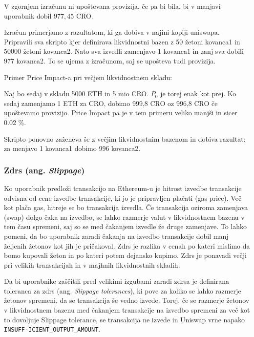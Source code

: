 \documentclass[a4paper,12pt]{article}%
\begin{document}
V zgornjem izračunu ni upoštevana provizija, če pa bi bila, bi v manjavi uporabnik dobil $977,45$ CRO.

Izračun primerjamo z razultatom, ki ga dobiva v najini kopiji uniswapa. Pripravili sva skripto kjer definirava likvidnostni bazen z 50 žetoni kovanca1 in 50000 žetoni kovanca2. Nato sva izvedli zamenjavo 1 kovanca1 in zanj sva dobili 977 kovanca2. To se ujema z izračunom, saj se upošteva tudi provizija. 

Primer Price Impact-a pri večjem likvidnostnem skladu:

Naj bo sedaj v skladu 5000 ETH in 5 mio CRO. $P_0$ je torej enak kot prej. Ko sedaj zamenjamo 1 ETH za CRO, dobimo 999,8 CRO oz 996,8 CRO če upoštevamo provizijo. Price Impact pa je v tem primeru veliko manjši in sicer 0.02 \%. 

Skripto ponovno zaženeva še z večjim likvidnostnim bazenom in dobiva razultat: za menjavo 1 kovanca1 dobimo 996 kovanca2.

\subsubsection{Zdrs (ang. \textit{Slippage})}

Ko uporabnik predloži transakcijo na Ethereum-u je hitrost izvedbe transakcije odvisna od cene izvedbe transakcije, ki jo je pripravljen plačati (gas price). Več kot plača gas, hitreje se bo transakcija izvedla. Če transakcija oziroma zamenjava (swap) dolgo čaka na izvedbo, se lahko razmerje valut v likvidnostnem bazenu v tem času spremeni, saj so se med čakanjem izvedle že druge zamenjave. To lahko pomeni, da bo uporabnik zaradi čakanja na izvedbo transakcije dobil manj željenih žetonov kot jih je pričakoval. Zdrs je razlika v cenah po kateri mislimo da bomo kupovali žeton in po kateri potem dejansko kupimo. Zdrs je ponavadi večji pri velikih transakcijah in v majhnih likvidnostnih skladih.

Da bi uporabnike zaščitili pred velikimi izgubami zaradi zdrsa je definirana toleranca za zdrs (ang. \textit{Slippage tolerances}), ki pove za koliko se lahko razmerje žetonov spremeni, da se transakcija še vedno izvede. Torej, če se razmerje žetonov v likvidnostnem bazenu med čakanjem transakcije na izvedbo spremeni za več kot to dovoljuje Slippage tolerance, se transakcija ne izvede in Uniswap vrne napako \texttt{INSUFF-ICIENT\_OUTPUT\_AMOUNT}. 
\end{document}
